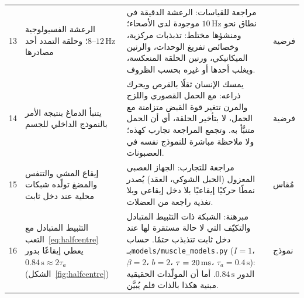 {\begin{longtable}{>{\raggedright}p{0.5cm}>{\raggedright}p{4.0cm}>{\raggedright}p{5.6cm}>{\raggedright}p{2.3cm}>{\raggedright\arraybackslash}p{1.7cm}}
13 & الرعشة الفسيولوجية $8\text{--}12\,\text{Hz}$؛ وحلقة التمدد أحد مصادرها & مراجعة للقياسات: الرعشة الدقيقة في نطاق نحو $10\,\text{Hz}$ موجودة لدى الأصحاء؛ ومنشؤها مختلط: تذبذبات مركزية، وخصائص تفريغ الوحدات، والرنين الميكانيكي، ورنين الحلقة المنعكسة، ويغلب أحدها أو غيره بحسب الظروف. & \cite{McAuleyMarsden2000} & فرضية \\
14 & يتنبأ الدماغ بنتيجة الأمر بالنموذج الداخلي للجسم & يمسك الإنسان ثقلًا بالقرص ويحرك ذراعه: مع الحمل القصوري واللزج والمرن تتغير قوة القبض متزامنة مع الحمل، لا بتأخير الحلقة، أي أن الحمل متنبَّأ به. وتجمع المراجعة تجارب كهذه؛ ولا ملاحظة مباشرة للنموذج نفسه في العصبونات. & \cite{FlanaganWing1997grip, WolpertGhahramani2000} & فرضية \\
15 & إيقاع المشي والتنفس والمضغ تولّده شبكات محلية عند دخل ثابت & مراجعة للتجارب: الجهاز العصبي المعزول (الحبل الشوكي، العقد) يُصدر نمطًا حركيًا إيقاعيًا بلا دخل إيقاعي وبلا تغذية راجعة من العضلات. & \cite{MarderBucher2001} & مُقاس \\
16 & التثبيط المتبادل مع التعب~\eqref{eq:halfcentre} يعطي إيقاعًا بدور $0.84\,\text{s}\approx2\tau_a$ (الشكل~\ref{fig:halfcentre}) & مبرهنة: الشبكة ذات التثبيط المتبادل والتكيّف التي لا حالة مستقرة لها عند دخل ثابت تتذبذب حتمًا. حساب بـ\foreignlanguage{english}{\texttt{models/\allowbreak muscle\_\allowbreak models.py}} ($I=1$، $\beta=2$، $b=2$، $\tau=20\,\text{ms}$، $\tau_a=0.4\,\text{s}$): الدور $0.84\,\text{s}$. أما أن المولّدات الحقيقية مبنية هكذا بالذات فلم يُبيَّن. & \cite{Matsuoka1985osc} & نموذج \\
\bottomrule
\end{longtable}}
